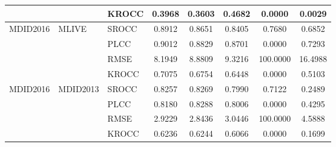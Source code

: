 \documentclass{article}
\begin{document}
\begin{table}
\begin{tabular}{||l|l|l||ccccc||}
\cmidrule{3-8}
&&KROCC&0.3968&0.3603&0.4682&0.0000&0.0029\\
\midrule
\multirow{4}{*}{MDID2016}&\multirow{4}{*}{MLIVE}&SROCC&0.8912&0.8651&0.8405&0.7680&0.6852\\
\cmidrule{3-8}
&&PLCC&0.9012&0.8829&0.8701&0.0000&0.7293\\
\cmidrule{3-8}
&&RMSE&8.1949&8.8809&9.3216&100.0000&16.4988\\
\cmidrule{3-8}
&&KROCC&0.7075&0.6754&0.6448&0.0000&0.5103\\
\midrule
\multirow{4}{*}{MDID2016}&\multirow{4}{*}{MDID2013}&SROCC&0.8257&0.8269&0.7990&0.7122&0.2489\\
\cmidrule{3-8}
&&PLCC&0.8180&0.8288&0.8006&0.0000&0.4295\\
\cmidrule{3-8}
&&RMSE&2.9229&2.8436&3.0446&100.0000&4.5888\\
\cmidrule{3-8}
&&KROCC&0.6236&0.6244&0.6066&0.0000&0.1699\\
\midrule
\end{tabular}
\end{table}
\end{document}
